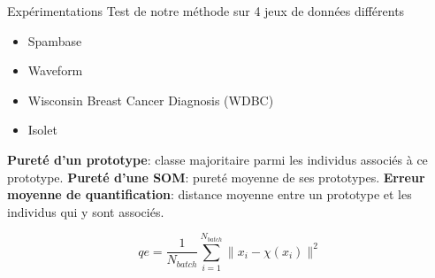 \documentclass[hyperref={pdfpagelabels=false}]{beamer}
\begin{document}
        
        \begin{frame}{Expérimentations}
            Test de notre méthode sur 4 jeux de données différents
            \begin{itemize}
                \item Spambase
                \item Waveform
                \item Wisconsin Breast Cancer Diagnosis (WDBC)
                \item Isolet
            \end{itemize}

            \textbf{Pureté d'un prototype}: classe majoritaire parmi les
            individus associés à ce prototype.
            \textbf{Pureté d'une SOM}: pureté moyenne de ses prototypes.
            \textbf{Erreur moyenne de quantification}: distance moyenne
            entre un prototype et les individus qui y sont associés.

            \begin{equation*}
                qe = \frac{1}{N_{batch}}\sum_{i=1}^{N_{batch}}\|x_i -
                \chi(x_i)\|^2
            \end{equation*}
        \end{frame}
\end{document}
